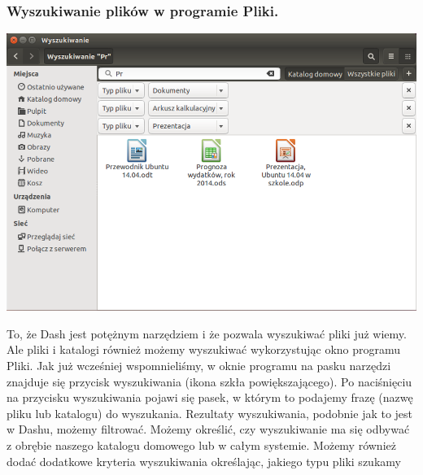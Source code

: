\subsubsection{Wyszukiwanie plików w programie Pliki.}
\begin{center}
	\includegraphics[scale=0.5]{images/programy_nautilus2.png}
\end{center}

To, że Dash jest potężnym narzędziem i że pozwala wyszukiwać pliki już wiemy. Ale pliki i katalogi również możemy wyszukiwać wykorzystując okno programu Pliki. Jak już wcześniej wspomnieliśmy, w oknie programu na pasku narzędzi znajduje się przycisk wyszukiwania (ikona szkła powiększającego). Po naciśnięciu na przycisku wyszukiwania pojawi się pasek, w którym to podajemy frazę (nazwę pliku lub katalogu) do wyszukania. Rezultaty wyszukiwania, podobnie jak to jest w Dashu, możemy filtrować. Możemy określić, czy wyszukiwanie ma się odbywać z obrębie naszego katalogu domowego lub w całym systemie. Możemy również dodać dodatkowe kryteria wyszukiwania określając, jakiego typu pliki szukamy